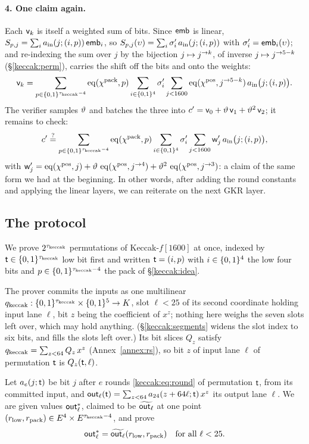 \paragraph{4. One claim again.} Each $\mathsf{v}_k$ is itself a weighted sum of bits. Since $\mathsf{emb}$ is linear, $S_{p,j}=\sum_ia_{\mathrm{in}}(j;(i,p))\,\mathsf{emb}_i$, so $S_{p,j}(\upsilon)=\sum_i\sigma'_i\,a_{\mathrm{in}}(j;(i,p))$ with $\sigma'_i=\mathsf{emb}_i(\upsilon)$; and re-indexing the sum over $j$ by the bijection $j\mapsto j^{\rightarrow k}$, of inverse $j\mapsto j^{\rightarrow 5-k}$ (\S\ref{keccak:perm}), carries the shift off the bits and onto the weights:
\[
\mathsf{v}_k=\sum_{p\in\{0,1\}^{\tau_{\mathrm{keccak}}-4}}\operatorname{eq}(\chi^{\mathrm{pack}},p)\sum_{i\in\{0,1\}^{4}}\sigma'_i\sum_{j<1600}\operatorname{eq}(\chi^{\mathrm{pos}},j^{\rightarrow 5-k})\,a_{\mathrm{in}}\bigl(j;(i,p)\bigr).
\]
The verifier samples $\vartheta$ and batches the three into $c'=\mathsf{v}_0+\vartheta\,\mathsf{v}_1+\vartheta^{2}\,\mathsf{v}_2$; it remains to check:
\[
c'\stackrel{?}{=}\sum_{p\in\{0,1\}^{\tau_{\mathrm{keccak}}-4}}\operatorname{eq}(\chi^{\mathrm{pack}},p)\sum_{i\in\{0,1\}^{4}}\sigma'_i\sum_{j<1600}\mathsf{w}'_j\,a_{\mathrm{in}}\bigl(j;(i,p)\bigr),
\]
with $\mathsf{w}'_j=\operatorname{eq}(\chi^{\mathrm{pos}},j)+\vartheta\,\operatorname{eq}(\chi^{\mathrm{pos}},j^{\rightarrow 4})+\vartheta^{2}\,\operatorname{eq}(\chi^{\mathrm{pos}},j^{\rightarrow 3})$: a claim of the same form we had at the beginning. In other words, after adding the round constants and applying the linear layers, we can reiterate on the next GKR layer.

\subsection{The protocol}\label{keccak:statement}

We prove $2^{\tau_{\mathrm{keccak}}}$ permutations of Keccak-$f[1600]$ at once, indexed by $\mathsf{t}\in\{0,1\}^{\tau_{\mathrm{keccak}}}$ low bit first and written $\mathsf{t}=(i,p)$ with $i\in\{0,1\}^{4}$ the low four bits and $p\in\{0,1\}^{\tau_{\mathrm{keccak}}-4}$ the pack of \S\ref{keccak:idea}.

The prover commits the inputs as one multilinear $q_{\mathrm{keccak}}:\{0,1\}^{\tau_{\mathrm{keccak}}}\times\{0,1\}^{5}\to K$, slot $\ell<25$ of its second coordinate holding input lane $\ell$, bit $z$ being the coefficient of $x^z$; nothing here weighs the seven slots left over, which may hold anything. (\S\ref{keccak:segments} widens the slot index to six bits, and fills the slots left over.) Its bit slices $Q_z$ satisfy $q_{\mathrm{keccak}}=\sum_{z<64}Q_z\,x^z$ (Annex~\ref{annex:rs}), so bit $z$ of input lane $\ell$ of permutation $\mathsf{t}$ is $Q_z(\mathsf{t},\ell)$.

Let $a_e(j;\mathsf{t})$ be bit $j$ after $e$ rounds \eqref{keccak:eq:round} of permutation $\mathsf{t}$, from its committed input, and $\mathsf{out}_{\ell}(\mathsf{t})=\sum_{z<64}a_{24}(z+64\ell;\mathsf{t})\,x^z$ its output lane $\ell$. We are given values $\mathsf{out}^{*}_{\ell}$, claimed to be $\widetilde{\mathsf{out}_{\ell}}$ at one point $(r_{\mathrm{low}},r_{\mathrm{pack}})\in E^{4}\times E^{\tau_{\mathrm{keccak}}-4}$, and prove
\begin{equation}\label{keccak:eq:statement}
\mathsf{out}^{*}_{\ell}=\widetilde{\mathsf{out}_{\ell}}(r_{\mathrm{low}},r_{\mathrm{pack}})\quad\text{for all }\ell<25.
\end{equation}

